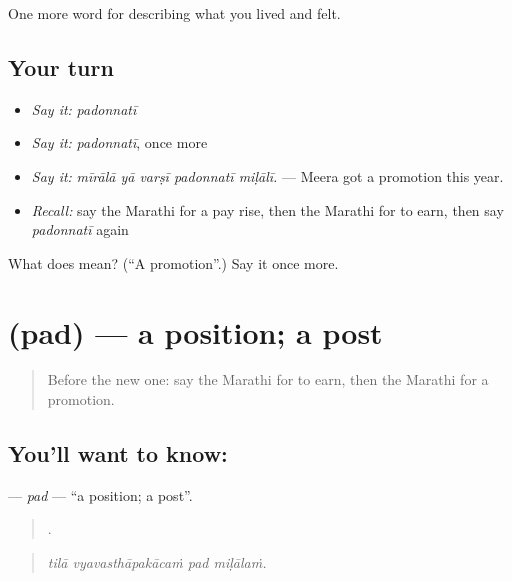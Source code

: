 \begin{grammarlens}[title={What you've built}]
One more word for describing what you lived and felt.
\end{grammarlens}

\subsection*{Your turn}
\begin{itemize}
\raggedright
  \item \emph{Say it:} \emph{padonnatī}
  \item \emph{Say it:} \emph{padonnatī}, once more
  \item \emph{Say it:} \emph{mīrālā yā varṣī padonnatī miḷālī.} — Meera got a promotion this year.
  \item \emph{Recall:} say the Marathi for a pay rise, then the Marathi for to earn, then say \emph{padonnatī} again
\end{itemize}

\begin{tcolorbox}[breakable,colback=teal!4,colframe=teal!35!black,title={Before you move on}]
What does  mean? (\textquotedblleft{}A promotion\textquotedblright{}.) Say it once more.
\end{tcolorbox}
\section[\texorpdfstring{\mr{पद} (pad)}{पद (pad)}]{ (pad) — a position; a post}

\label{lesson:MR-C509-pad}



\begin{quote}
Before the new one: say the Marathi for to earn, then the Marathi for a promotion.
\end{quote}

\subsection*{You'll want to know: }
\textbf{} — \emph{pad} — \textquotedblleft{}a position; a post\textquotedblright{}.

\begin{quote}
   .
\end{quote}

\begin{quote}
\emph{tilā vyavasthāpakācaṁ pad miḷālaṁ.}
\end{quote}

